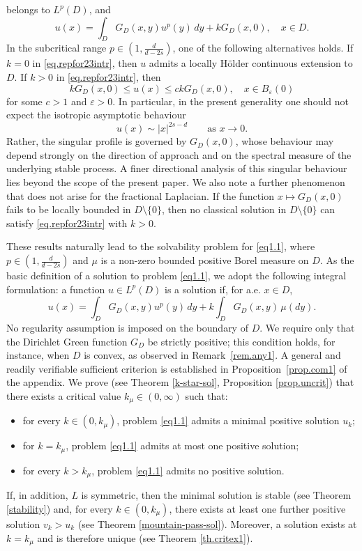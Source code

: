 \documentclass[11pt,a4paper,reqno]{amsart}
\theoremstyle{definition}
\numberwithin{equation}{section}
\begin{document}
belongs to  $L^p(D)$, and
\begin{equation}
\label{eq.repfor23intr}
u(x)=\int_DG_D(x,y)u^p(y)\,dy+kG_D(x,0),\quad x\in D.
\end{equation} 
In the subcritical range $p\in(1,\frac{d}{d-2s})$, one of the following alternatives holds.
If $k=0$ in \eqref{eq.repfor23intr}, then $u$ admits a locally H\"older continuous extension to $D$. If $k>0$  in \eqref{eq.repfor23intr}, 
then 
\[
kG_D(x,0)\le u(x)\le c kG_D(x,0),\quad x \in B_\varepsilon(0)
\]
for some  $c>1$ and $\varepsilon>0$.
In particular, in the present generality one should not expect the isotropic asymptotic behaviour
\[
u(x)\sim |x|^{2s-d}
\qquad\text{as }x\to0.
\]
Rather, the singular profile is governed by $G_D(x,0)$, whose behaviour may depend strongly on the direction of 
approach and on the spectral measure of the underlying stable process.
A finer directional analysis of this singular behaviour lies beyond the
scope of the present paper.
We also note a further phenomenon that does not arise for the fractional Laplacian. If the function 
$x\mapsto G_D(x,0)$ fails to be locally bounded in $D\setminus{\{0\}}$, then no classical solution in $D\setminus\{0\}$
can satisfy \eqref{eq.repfor23intr} with $k>0$. 

These results naturally lead to the solvability problem for \eqref{eq1.1}, where $p\in\left(1,\frac{d}{d-2s}\right)$
and $\mu$ is a non-zero bounded positive Borel measure on $D$. 
As the basic definition of a solution to problem \eqref{eq1.1}, we adopt the following integral formulation: 
a function $u\in L^p(D)$ is a solution if, for a.e. $x\in D$,
\begin{equation}
\label{eq.for.int.int}
u(x)=\int_D G_D(x,y)u^p(y)\,dy+k\int_D G_D(x,y)\,\mu(dy).
\end{equation}
No regularity assumption is imposed on the boundary of \(D\). We require only that the Dirichlet Green function \(G_D\) 
be strictly positive; this condition holds, for instance, when \(D\) is convex, as observed in Remark~\ref{rem.any1}. A general and 
readily verifiable sufficient criterion is established in Proposition~\ref{prop.com1} of the appendix.
We prove (see Theorem \ref{k-star-sol}, Proposition \ref{prop.uncrit}) that there exists a critical value $k_\mu\in(0,\infty)$ such that:
\begin{itemize}
\item for every $k\in(0,k_\mu)$, problem \eqref{eq1.1} admits a minimal positive solution $u_k$;
\item for $k=k_\mu$, problem \eqref{eq1.1} admits at most one positive solution;
\item for every $k>k_\mu$, problem \eqref{eq1.1} admits no positive solution.
\end{itemize}
If, in addition, $L$ is symmetric, then the minimal solution is stable (see Theorem \ref{stability}) 
and, for every $k\in(0,k_\mu)$, there exists at least one further positive solution
$v_k>u_k$ (see Theorem \ref{mountain-pass-sol}).  Moreover, a solution exists at $k=k_\mu$ 
and is therefore unique (see Theorem \ref{th.critex1}).
\end{document}
